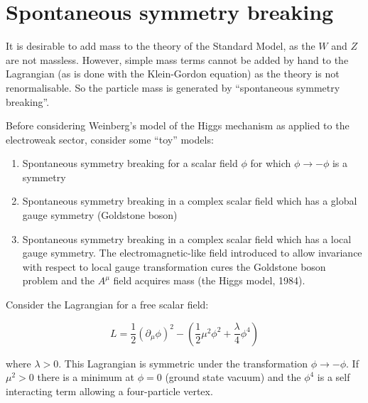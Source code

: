 
\chapter{Spontaneous symmetry breaking}

It is desirable to add mass to the theory of the Standard Model, as the $W$ and $Z$ are not massless.  However, simple mass terms cannot be added by hand to the Lagrangian (as is done with the Klein-Gordon equation) as the theory is not renormalisable.  So the particle mass is generated by ``spontaneous symmetry breaking''.

Before considering Weinberg's model of the Higgs mechanism as applied to the electroweak sector, consider some ``toy'' models:

\begin{enumerate}
  \item Spontaneous symmetry breaking for a scalar field $\phi$ for which $\phi \to -\phi$ is a symmetry
  \item Spontaneous symmetry breaking in a complex scalar field which has a global gauge symmetry (Goldstone boson)
  \item Spontaneous symmetry breaking in a complex scalar field which has a local gauge symmetry.  The electromagnetic-like field introduced to allow invariance with respect to local gauge transformation cures the Goldstone boson problem and the $A^{\mu}$ field acquires mass (the Higgs model, 1984).
\end{enumerate}

Consider the Lagrangian for a free scalar field:

\[
  L = \frac{1}{2}\left(\partial_{\mu}\phi\right)^2 - \left(\frac{1}{2}\mu^2\phi^2 + \frac{\lambda}{4}\phi^4\right)
\]

where $\lambda>0$.  This Lagrangian is symmetric under the transformation $\phi \to -\phi$.  If $\mu^2>0$ there is a minimum at $\phi = 0$ (ground state vacuum) and the $\phi^4$ is a self interacting term allowing a four-particle vertex.

